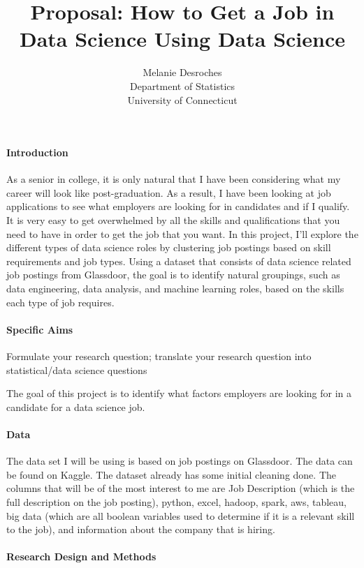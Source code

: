 \documentclass[12pt]{article}
\title{Proposal: How to Get a Job in Data Science Using Data Science}
\author{Melanie Desroches\\
  Department of Statistics\\
  University of Connecticut
}
\begin{document}
\maketitle


\paragraph{Introduction}


As a senior in college, it is only natural that I have been considering what my career will look like post-graduation.
As a result, I have been looking at job applications to see what employers are looking for in candidates and if I qualify. 
It is very easy to get overwhelmed by all the skills and qualifications that you need to have in order to get the job that 
you want. In this project, I’ll explore the different types of data science roles by clustering job postings based on skill 
requirements and job types. Using a dataset that consists of data science related job postings from Glassdoor, the goal is to
identify natural groupings, such as data engineering, data analysis, and machine learning roles, based on the skills each type 
of job requires.

\paragraph{Specific Aims}
Formulate your research question;
translate your research question into statistical/data science questions

The goal of this project is to identify what factors employers are looking for in a candidate for a data science job.

\paragraph{Data}

The data set I will be using is based on job postings on Glassdoor. The data can be found on Kaggle. The dataset already has
some initial cleaning done. The columns that will be of the most interest to me are Job Description (which is the full description
on the job posting), python, excel, hadoop, spark, aws, tableau, big data (which are all boolean variables used to determine
if it is a relevant skill to the job), and information about the company that is hiring.


\paragraph{Research Design and Methods}
\end{document}
